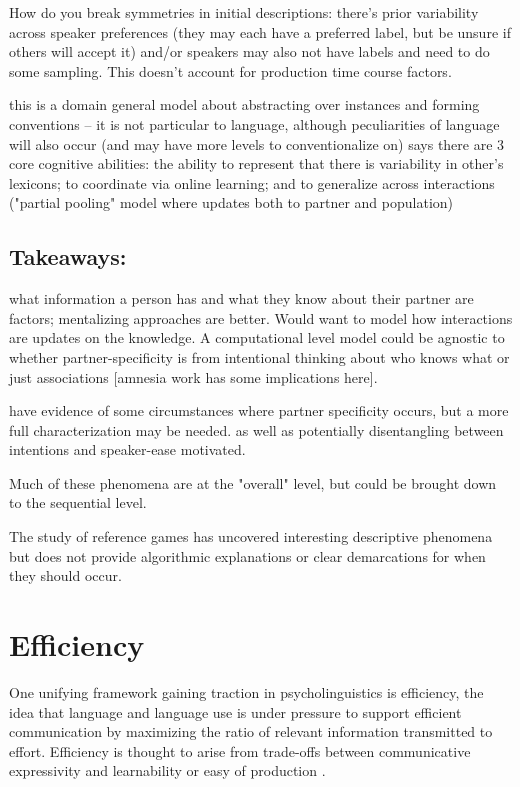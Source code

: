\documentclass[]{article}
\begin{document}
\cite{hawkins2020b} How do you break symmetries in initial descriptions: there's prior variability across speaker preferences (they may each have a preferred label, but be unsure if others will accept it) and/or speakers may also not have labels and need to do some sampling. This doesn't account for production time course factors. 

this is a domain general model about abstracting over instances and forming conventions -- it is not particular to language, although peculiarities of language will also occur (and may have more levels to conventionalize on) 
\cite{hawkins2021} says there are 3 core cognitive abilities: the ability to represent that there is variability in other's lexicons; to coordinate via online learning; and to generalize across interactions ("partial pooling" model where updates both to partner and population) 

\subsection{Takeaways:} what information a person has and what they know about their partner are factors; mentalizing approaches are better. Would want to model how interactions are updates on the knowledge. A computational level model could be agnostic to whether partner-specificity is from intentional thinking about who knows what or just associations [amnesia work has some implications here].  

have evidence of some circumstances where partner specificity occurs, but a more full characterization may be needed. as well as potentially disentangling between intentions and speaker-ease motivated. 

Much of these phenomena are at the "overall" level, but could be brought down to the sequential level. 

The study of reference games has uncovered interesting descriptive phenomena but does not provide algorithmic explanations or clear demarcations for when they should occur. 

\section{Efficiency}
One unifying framework gaining traction in psycholinguistics is efficiency, the idea that language and language use is under pressure to support efficient communication by maximizing the ratio of relevant information transmitted to effort. Efficiency is thought to arise from trade-offs between communicative expressivity and learnability or easy of production \cite{piantadosi2012, kirby2015}. 
\end{document}
